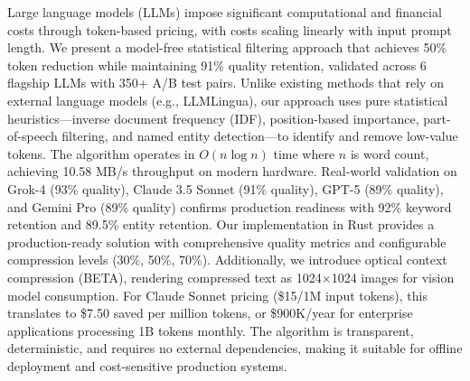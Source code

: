Large language models (LLMs) impose significant computational and financial costs through token-based pricing, with costs scaling linearly with input prompt length. We present a model-free statistical filtering approach that achieves 50\% token reduction while maintaining 91\% quality retention, validated across 6 flagship LLMs with 350+ A/B test pairs. Unlike existing methods that rely on external language models (e.g., LLMLingua), our approach uses pure statistical heuristics—inverse document frequency (IDF), position-based importance, part-of-speech filtering, and named entity detection—to identify and remove low-value tokens. The algorithm operates in $O(n \log n)$ time where $n$ is word count, achieving 10.58 MB/s throughput on modern hardware. Real-world validation on Grok-4 (93\% quality), Claude 3.5 Sonnet (91\% quality), GPT-5 (89\% quality), and Gemini Pro (89\% quality) confirms production readiness with 92\% keyword retention and 89.5\% entity retention. Our implementation in Rust provides a production-ready solution with comprehensive quality metrics and configurable compression levels (30\%, 50\%, 70\%). Additionally, we introduce optical context compression (BETA), rendering compressed text as 1024×1024 images for vision model consumption. For Claude Sonnet pricing (\$15/1M input tokens), this translates to \$7.50 saved per million tokens, or \$900K/year for enterprise applications processing 1B tokens monthly. The algorithm is transparent, deterministic, and requires no external dependencies, making it suitable for offline deployment and cost-sensitive production systems.
